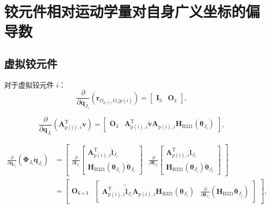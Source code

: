 \section{铰元件相对运动学量对自身广义坐标的偏导数}
\label{sec:11.5}

\subsection{虚拟铰元件}

对于虚拟铰元件 $i$：
\begin{equation}\label{eq:11.14}
\frac{\partial}{\partial \boldsymbol{q}_{J_i}} \left( \boldsymbol{r}_{O_{p(i)}O_i|p(i)} \right) = \begin{bmatrix}
\boldsymbol{I}_3 & \boldsymbol{O}_3
\end{bmatrix},
\end{equation}

\begin{equation}\label{eq:11.15}
\frac{\partial}{\partial \boldsymbol{q}_{J_i}} \left( \boldsymbol{A}_{p(i),i}^{\mathrm{T}} \boldsymbol{v} \right) = \begin{bmatrix}
\boldsymbol{O}_3 & \boldsymbol{A}_{p(i),i}^{\mathrm{T}} \tilde{\boldsymbol{v}} \boldsymbol{A}_{p(i),i} \boldsymbol{H}_{\mathrm{B321}}(\boldsymbol{\theta}_{J_i})
\end{bmatrix},
\end{equation}

\begin{equation}\label{eq:11.16}
\begin{aligned}
\frac{\partial}{\partial \boldsymbol{q}_{J_i}} \left( \boldsymbol{\Phi}_{J_i} \dot{\boldsymbol{q}}_{J_i} \right)
&=
\begin{bmatrix}
\displaystyle \frac{\partial}{\partial \boldsymbol{l}_{J_i}} \begin{bmatrix}
\boldsymbol{A}_{p(i),i}^{\mathrm{T}} \dot{\boldsymbol{l}}_{J_i} \\
\boldsymbol{H}_{\mathrm{B321}}(\boldsymbol{\theta}_{J_i}) \dot{\boldsymbol{\theta}}_{J_i}
\end{bmatrix} &
\displaystyle \frac{\partial}{\partial \boldsymbol{\theta}_{J_i}} \begin{bmatrix}
\boldsymbol{A}_{p(i),i}^{\mathrm{T}} \dot{\boldsymbol{l}}_{J_i} \\
\boldsymbol{H}_{\mathrm{B321}}(\boldsymbol{\theta}_{J_i}) \dot{\boldsymbol{\theta}}_{J_i}
\end{bmatrix}
\end{bmatrix} \\
&= \begin{bmatrix}
\boldsymbol{O}_{6 \times 3} &
\begin{bmatrix}
\boldsymbol{A}_{p(i),i}^{\mathrm{T}} \tilde{\dot{\boldsymbol{l}}}_{J_i} \boldsymbol{A}_{p(i),i} \boldsymbol{H}_{\mathrm{B321}}(\boldsymbol{\theta}_{J_i}) & \displaystyle \frac{\partial}{\partial \boldsymbol{\theta}_{J_i}} \left( \boldsymbol{H}_{\mathrm{B321}} \dot{\boldsymbol{\theta}}_{J_j} \right)
\end{bmatrix}
\end{bmatrix},
\end{aligned}
\end{equation}

